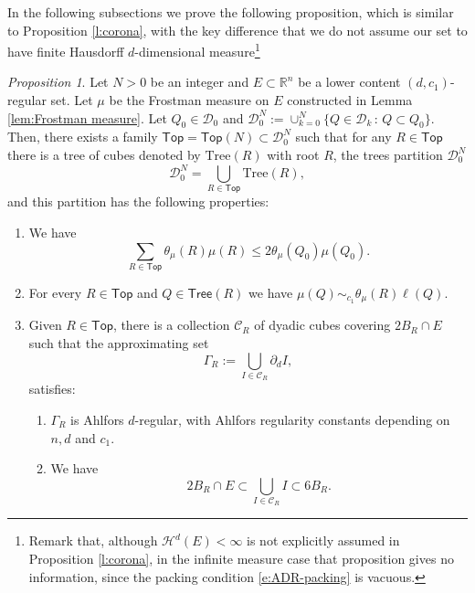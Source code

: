 \documentclass[11pt,reqno]{amsart}
\newcommand{\Top}{\mathsf{Top}}
\newcommand{\Tr}{\mathrm{Tree}}
\def\cC{{\mathscr{C}}}
\newcommand{\Tree}{\mathsf{Tree}}
\theoremstyle{definition}
\theoremstyle{remark}
\numberwithin{equation}{section}
\newcommand{\R}{\mathbb{R}}
\newcommand{\dD}{\mathcal{D}}
\theoremstyle{theorem}
\newtheorem{propo}[theorem]{Proposition}
\theoremstyle{definition}
\theoremstyle{remark}
\numberwithin{equation}{section}
\begin{document}
In the following subsections we prove the following proposition, which is similar to Proposition \ref{l:corona}, with the key difference that we do not assume our set to have finite Hausdorff $d$-dimensional measure\footnote{Remark that, although $\mathcal{H}^d(E)<\infty$ is not explicitly assumed in Proposition \ref{l:corona}, in the infinite measure case that proposition gives no information, since the packing condition \eqref{e:ADR-packing} is vacuous.}
\begin{propo}\label{prop:coronization}
    Let $N>0$ be an integer and $E \subset \R^n$ be a lower content $(d,c_1)$-regular set. Let $\mu$ be the Frostman measure on $E$ constructed in Lemma \ref{lem:Frostman measure}. Let $Q_0 \in \dD_0$ and $\dD_0^N:=\cup_{k=0}^N \{ Q \in \dD_k \, : \, Q \subset Q_0\}$. Then, there exists a family $\Top=\Top(N) \subset \dD_0^N$ such that for any $R \in \Top$ there is a tree of cubes denoted by $\Tr(R)$ with root $R$, the trees partition $\dD_0^N$
    \begin{equation*}
		\dD_0^N = \bigcup_{R\in\Top}\Tr(R),
		\end{equation*}
    and this partition has the following properties:
    \begin{enumerate}
        \item We have
        \begin{equation}\label{e:packing-corona-nonsigmafinite}
            \sum_{R \in \Top} \theta_\mu(R) \mu(R) \leq 2 \theta_\mu(Q_0)\mu(Q_0).
        \end{equation}
        \item For every $R\in\Top$ and $Q\in\Tree(R)$ we have $\mu(Q)\sim_{c_1} \theta_\mu(R) \ell(Q).$
        \item Given $R \in \Top$, there is a collection $\cC_R$ of dyadic cubes covering $2 B_R \cap E$  such that the approximating set
        \begin{equation*}
            \Gamma_R := \bigcup_{I \in \cC_R} \partial_d I,
        \end{equation*}
        satisfies:
        \begin{enumerate}
            \item $\Gamma_R$ is Ahlfors $d$-regular, with Ahlfors regularity constants depending on $n,d$ and $c_1$.
            \item We have
            \begin{equation*}
                2B_R \cap E \subset \bigcup_{I \in \cC_R} I \subset 6 B_R.
            \end{equation*}

\end{enumerate}
\end{enumerate}
\end{propo}
\end{document}
